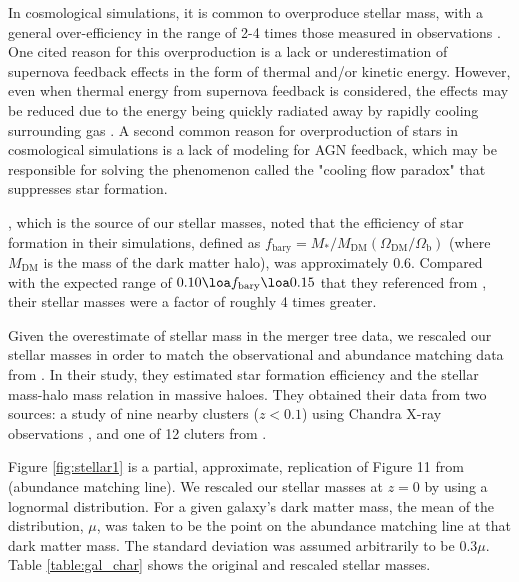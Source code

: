 \documentclass[fleqn,usenatbib,useAMS]{mnras}
\begin{document}
In cosmological simulations, it is common to overproduce stellar mass, with a general over-efficiency in the range of 2-4 times those measured in observations \citep{1996ApJS..105...19K, 2010MNRAS.404.1111G, 2010ApJ...725.2312O}.  One cited reason for this overproduction is a lack or underestimation of supernova feedback effects in the form of thermal and/or kinetic energy.  However, even when thermal energy from supernova feedback is considered, the effects may be reduced due to the energy being quickly radiated away by rapidly cooling surrounding gas \citep{1996ApJS..105...19K}.  A second common reason for overproduction of stars in cosmological simulations is a lack of modeling for AGN feedback, which may be responsible for solving the phenomenon called the "cooling flow paradox" \citep{2001MNRAS.321L..20F} that suppresses star formation. 

\citet{2012MNRAS.425..641L}, which is the source of our stellar masses, noted that the efficiency of star formation in their simulations, defined as $f_\mathrm{bary}=M_*/M_{\mathrm{DM}}(\Omega_\mathrm{DM}/\Omega_\mathrm{b})$ (where $M_\mathrm{DM}$ is the mass of the dark matter halo), was approximately 0.6.  Compared with the expected range of $0.10 \loa f_\mathrm{bary} \loa 0.15$ that they referenced from \citet{2012ApJ...746...95L}, their stellar masses were a factor of roughly 4 times greater.

Given the overestimate of stellar mass in the merger tree data, we rescaled our stellar masses in order to match the observational and abundance matching data from \citet{2018AstL...44....8K}. In their study, they estimated star formation efficiency and the stellar mass-halo mass relation in massive haloes.  They obtained their data from two sources: a study of nine nearby clusters ($z<0.1$) using Chandra X-ray observations \citep{2009ApJ...692.1033V}, and one of 12 cluters from \citet{2013ApJ...778...14G}.

Figure \ref{fig:stellar1} is a partial, approximate, replication of Figure 11 from \citet{2018AstL...44....8K} (abundance matching line).  We rescaled our stellar masses at $z=0$ by using a lognormal distribution.  For a given galaxy's dark matter mass, the mean of the distribution, $\mu$, was taken to be the point on the abundance matching line at that dark matter mass.  The standard deviation was assumed arbitrarily to be $0.3\mu$.  Table \ref{table:gal_char} shows the original and rescaled stellar masses.
\end{document}
